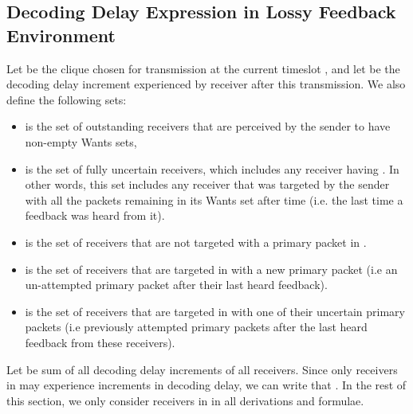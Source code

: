 \documentclass[10pt,jounral]{IEEEtran}
\begin{document}
\subsection{Decoding Delay Expression in Lossy Feedback Environment}
Let  be the clique chosen for transmission at the current timeslot , and let  be the decoding delay increment experienced by receiver  after this transmission. We also define the following sets:
\begin{itemize}
\item  is the set of outstanding receivers that are perceived by the sender to have non-empty Wants sets,
\item  is the set of fully uncertain receivers, which includes any receiver  having . In other words, this set includes any receiver  that was targeted by the sender with all the packets remaining in its Wants set after time  (i.e. the last time a feedback was heard from it).
\item  is the set of receivers that are not targeted with a primary packet in .
\item  is the set of receivers that are targeted in  with a new primary packet (i.e an un-attempted primary packet after their last heard feedback).
\item  is the set of receivers that are targeted in  with one of their uncertain primary packets (i.e previously attempted primary packets after the last heard feedback from these receivers).
\end{itemize}
Let  be sum of all decoding delay increments of all receivers. Since only receivers in  may experience increments in decoding delay, we can write that . In the rest of this section, we only consider receivers in  in all derivations and formulae.
\end{document}
